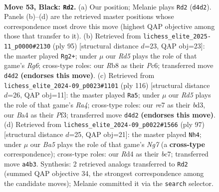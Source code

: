 \documentclass[11pt]{article}
\begin{document}
\clearpage

\begin{figure}[p]\centering
\begin{subfigure}{0.46\textwidth}\centering
\resizebox{\linewidth}{!}{%
\newchessgame
\chessboard[
  setfen={1r6/4R3/pp5k/8/bP1r4/P4B1K/8/5R2 b - - 9 53},
  showmover=false,
  pgfstyle=straightmove, color=movearrow, markmove={d4-d2}
]}
\caption{}
\end{subfigure}\hfill
\begin{subfigure}{0.46\textwidth}\centering
\resizebox{\linewidth}{!}{%
\newchessgame
\chessboard[
  setfen={8/R5PB/2p1b3/pp6/3k4/P5r1/1P1K4/8 b - - 4 48},
  showmover=false,
  pgfstyle=straightmove, color=movearrow, markmove={g3-g2}
]}
\caption{}
\end{subfigure}
\\[4pt]
\begin{subfigure}{0.46\textwidth}\centering
\resizebox{\linewidth}{!}{%
\newchessgame
\chessboard[
  setfen={8/3k4/8/2b1B1pp/R7/p2b1P2/7P/2K5 w - - 20 59},
  showmover=false,
  pgfstyle=straightmove, color=movearrow, markmove={a4-a5}
]}
\caption{}
\end{subfigure}\hfill
\begin{subfigure}{0.46\textwidth}\centering
\resizebox{\linewidth}{!}{%
\newchessgame
\chessboard[
  setfen={8/2B1k3/2R5/p5p1/P1P5/1r3P2/4K1n1/8 b - - 0 49},
  showmover=false,
  pgfstyle=straightmove, color=movearrow, markmove={g2-h4}
]}
\caption{}
\end{subfigure}
\caption{\textbf{Move 53, Black: \texttt{Rd2}.} (a) Our position; Melanie plays \texttt{Rd2} (\texttt{d4d2}). Panels (b)--(d) are the retrieved master positions whose correspondence most drove this move (highest QAP objective among those that transfer to it). (b) Retrieved from \texttt{lichess\_elite\_2025-11\_p0000\#2130} (ply 95) [structural distance $d$=23, QAP obj=23]: the master played \texttt{Rg2+}; under $\mu$ our \emph{Rd5} plays the role of that game's \emph{Rg6}; cross-type roles: our \emph{R}b8 as their \emph{P}c6; transferred move \texttt{d4d2} \textbf{(endorses this move)}. (c) Retrieved from \texttt{lichess\_elite\_2024-09\_p0023\#1101} (ply 116) [structural distance $d$=26, QAP obj=11]: the master played \texttt{Ra5}; under $\mu$ our \emph{Rd5} plays the role of that game's \emph{Ra4}; cross-type roles: our \emph{r}e7 as their \emph{b}d3, our \emph{B}a4 as their \emph{P}f3; transferred move \texttt{d4d2} \textbf{(endorses this move)}. (d) Retrieved from \texttt{lichess\_elite\_2024-09\_p0022\#1566} (ply 97) [structural distance $d$=25, QAP obj=21]: the master played \texttt{Nh4}; under $\mu$ our \emph{Ba5} plays the role of that game's \emph{Ng7} (a \textbf{cross-type} correspondence); cross-type roles: our \emph{R}d4 as their \emph{b}c7; transferred move \texttt{a4b3}. Synthesis: 2 retrieved analogs transferred to \texttt{Rd2} (summed QAP objective 34, the strongest correspondence among the candidate moves); Melanie committed it via the \texttt{search} selector.}
\label{fig:thought-m105}
\end{figure}
\end{document}
